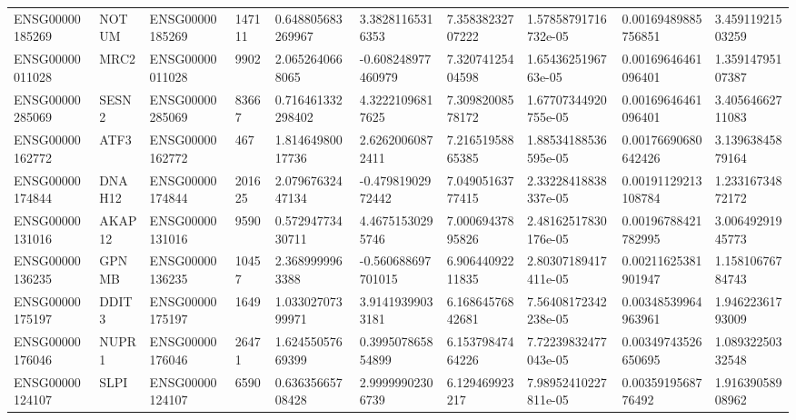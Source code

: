 \begin{tabular}{@{}llllllllll@{}}
ENSG00000185269 & NOTUM & ENSG00000185269 & 147111 & 0.648805683269967 & 3.38281165316353 & 7.35838232707222 & 1.57858791716732e-05 & 0.00169489885756851 & 3.45911921503259 \\
ENSG00000011028 & MRC2 & ENSG00000011028 & 9902 & 2.0652640668065 & -0.608248977460979 & 7.32074125404598 & 1.6543625196763e-05 & 0.00169646461096401 & 1.35914795107387 \\
ENSG00000285069 & SESN2 & ENSG00000285069 & 83667 & 0.716461332298402 & 4.32221096817625 & 7.30982008578172 & 1.67707344920755e-05 & 0.00169646461096401 & 3.40564662711083 \\
ENSG00000162772 & ATF3 & ENSG00000162772 & 467 & 1.81464980017736 & 2.62620060872411 & 7.21651958865385 & 1.88534188536595e-05 & 0.00176690680642426 & 3.13963845879164 \\
ENSG00000174844 & DNAH12 & ENSG00000174844 & 201625 & 2.07967632447134 & -0.47981902972442 & 7.04905163777415 & 2.33228418838337e-05 & 0.00191129213108784 & 1.23316734872172 \\
ENSG00000131016 & AKAP12 & ENSG00000131016 & 9590 & 0.57294773430711 & 4.46751530295746 & 7.00069437895826 & 2.48162517830176e-05 & 0.00196788421782995 & 3.00649291945773 \\
ENSG00000136235 & GPNMB & ENSG00000136235 & 10457 & 2.3689999963388 & -0.560688697701015 & 6.90644092211835 & 2.80307189417411e-05 & 0.00211625381901947 & 1.15810676784743 \\
ENSG00000175197 & DDIT3 & ENSG00000175197 & 1649 & 1.03302707399971 & 3.91419399033181 & 6.16864576842681 & 7.56408172342238e-05 & 0.00348539964963961 & 1.94622361793009 \\
ENSG00000176046 & NUPR1 & ENSG00000176046 & 26471 & 1.62455057669399 & 0.399507865854899 & 6.15379847464226 & 7.72239832477043e-05 & 0.00349743526650695 & 1.08932250332548 \\
ENSG00000124107 & SLPI & ENSG00000124107 & 6590 & 0.63635665708428 & 2.99999902306739 & 6.129469923217 & 7.98952410227811e-05 & 0.0035919568776492 & 1.91639058908962 \\
\bottomrule
\end{tabular}
\endgroup
